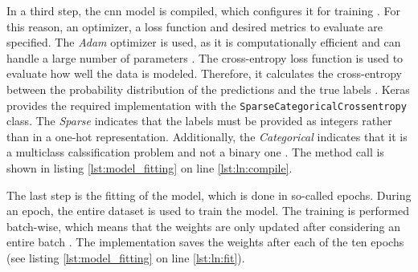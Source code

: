 In a third step, the \acrshort{cnn} model is compiled, which configures it for training \cite{}. %
For this reason, an optimizer, a loss function and desired metrics to evaluate are specified.
The \textit{Adam} optimizer is used, as it is computationally efficient and can handle a large number of parameters \cite{}. %
The cross-entropy loss function is used to evaluate how well the data is modeled.
Therefore, it calculates the cross-entropy between the probability distribution of the predictions and the true labels \cite{}. %
Keras provides the required implementation with the \texttt{SparseCategoricalCrossentropy} class.
The \textit{Sparse} indicates that the labels must be provided as integers rather than in a one-hot representation.
Additionally, the \textit{Categorical} indicates that it is a multiclass calssification problem and not a binary one \cite{}. %
The method call is shown in listing \ref{lst:model_fitting} on line \ref{lst:ln:compile}.

The last step is the fitting of the model, which is done in so-called epochs.
During an epoch, the entire dataset is used to train the model.
The training is performed batch-wise, which means that the weights are only updated after considering an entire batch \cite{}. %
The implementation saves the weights after each of the ten epochs (see listing \ref{lst:model_fitting} on line \ref{lst:ln:fit}).

